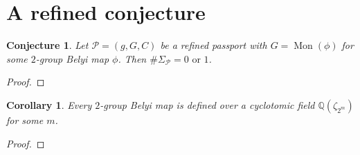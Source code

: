 \documentclass{dcthesis}
\newcommand{\QQ}{\mathbb Q}
\DeclareMathOperator{\Mon}{Mon}
\newtheorem{conj}[prop]{Conjecture}
\newtheorem{corr}[prop]{Corollary}
\theoremstyle{definition}
\theoremstyle{remark}
\numberwithin{equation}{section}
\numberwithin{figure}{section}
\begin{document}
{  \section{A refined conjecture}{\label{sec:conjecture}}{
    \begin{conj}
      Let $\mathcal{P} = (g,G,C)$
      be a refined passport with
      $G=\Mon(\phi)$ for some $2$-group Belyi map $\phi$.
      Then $\#\Sigma_\mathcal{P} = 0\text{ or }1$.
    \end{conj}
    \begin{proof}
    \end{proof}
    \begin{corr}
      Every $2$-group Belyi map is defined over a cyclotomic field
      $\QQ(\zeta_{2^m})$ for some $m$.
    \end{corr}
    \begin{proof}
    \end{proof}
  }
}
\end{document}

